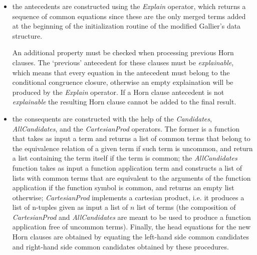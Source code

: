 \begin{itemize}
  \item the antecedents are constructed using the \emph{Explain} operator, 
    which returns a sequence of common equations since these are the 
    only merged terms added at the beginning of the initialization 
    routine of the modified Gallier's data structure.

    An additional property must be checked when processing previous
    Horn clauses. The `previous' antecedent for these clauses must be \emph{explainable},
    which means that every equation in the antecedent must belong to the conditional
    congruence closure, otherwise an empty explaination will be produced by the
    \emph{Explain} operator. If a Horn clause antecedent is not \emph{explainable}
    the resulting Horn clause cannot be added to the final result.
    
  \item the consequents are constructed with the help of the \emph{Candidates},
    \emph{AllCandidates}, and the \emph{CartesianProd} operators. 
    The former is a function that takes as input
    a term and returns a list of common terms
    that belong to the equivalence relation of a given term if such term is uncommon,
    and return a list containing the term itself if the term is common; the 
    \emph{AllCandidates} function takes as input a function application term and
    constructs a list of lists with common terms that are equivalent to the arguments
    of the function application if the function symbol is common, and returns an empty
    list otherwise; \emph{CartesianProd} implements a cartesian product, i.e. it 
    produces a list of n-tuples given as input a list of $n$ list of terms (the 
      composition of \emph{CartesianProd} and \emph{AllCandidates} are meant to be
    used to produce a function application free of uncommon terms). Finally, the
    head equations for the new Horn clauses are obtained by equating the left-hand
    side common candidates and right-hand side common candidates obtained by these 
    procedures.

\end{itemize}

